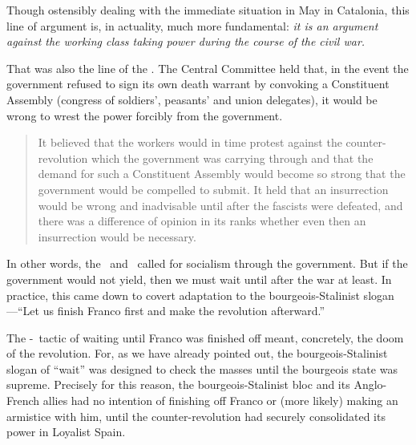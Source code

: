 Though ostensibly dealing with the immediate situation in May in Catalonia, this line of argument is, in actuality, much more fundamental: \emph{it is an argument against the working class taking power during the course of the civil war.}

That was also the line of the \POUM. The Central Committee held that, in the event the government refused to sign its own death warrant by convoking a Constituent Assembly (congress of soldiers’, peasants’ and union delegates), it would be wrong to wrest the power forcibly from the government.

\begin{quotation}
  It believed that the workers would in time protest against the counter-revolution which the government was carrying through and that the demand for such a Constituent Assembly would become so strong that the government would be compelled to submit. It held that an insurrection would be wrong and inadvisable until after the fascists were defeated, and there was a difference of opinion in its ranks whether even then an insurrection would be necessary.
\end{quotation}

In other words, the \CNT\ and \POUM\ called for socialism through the government. But if the government would not yield, then we must wait until after the war at least. In practice, this came down to covert adaptation to the bourgeois-Stalinist slogan---``Let us finish Franco first and make the revolution afterward.''

The \POUM-\CNT\ tactic of waiting until Franco was finished off meant, concretely, the doom of the revolution. For, as we have already pointed out, the bourgeois-Stalinist slogan of ``wait'' was designed to check the masses until the bourgeois state was supreme. Precisely for this reason, the bourgeois-Stalinist bloc and its Anglo-French allies had no intention of finishing off Franco or (more likely) making an armistice with him, until the counter-revolution had securely consolidated its power in Loyalist Spain.

